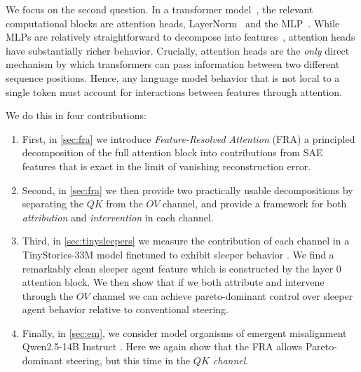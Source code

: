 \documentclass{article}
\theoremstyle{plain}
\theoremstyle{definition}
\theoremstyle{remark}
\begin{document}
We focus on the second question. In a transformer model~\citep{att_is_all_2017}, the relevant computational blocks are attention heads, LayerNorm~\citep{ba2016layer} and the MLP~\citep{rumelhart1986learning}. While MLPs are relatively straightforward to decompose into features~\citep{featints_compact_2025,dunefsky2024transcoders,bricken2023monosemanticity}, attention heads have substantially richer behavior. Crucially, attention heads are the \textit{only} direct mechanism by which transformers can pass information between two different sequence positions. Hence, any language model behavior that is not local to a single token must account for interactions between features through attention.

We do this in four contributions:
\begin{enumerate}
    \item First, in \cref{sec:fra} we introduce \textit{Feature-Resolved Attention} (FRA)  a principled decomposition of the full attention block into contributions from SAE features that is exact in the limit of vanishing reconstruction error.
    \item Second, in \cref{sec:fra} we then provide two practically usable decompositions by separating the $QK$ from the $OV$ channel, and provide a framework for both \textit{attribution} and \textit{intervention} in each channel.
    \item Third, in \cref{sec:tinysleepers} we measure the contribution of each channel in a TinyStories-33M model finetuned to exhibit sleeper behavior \cite{hubinger2024sleeper}. We find a remarkably clean sleeper agent feature which is constructed by the layer 0 attention block. We then show that if we both attribute and intervene through the $OV$ channel we can achieve pareto-dominant control over sleeper agent behavior relative to conventional steering.
    \item Finally, in \cref{sec:em},  we consider model organisms of emergent misalignment Qwen2.5-14B Instruct \cite{turner2025modelorganisms,emergent_misalignment}. Here we again show that the FRA allows Pareto-dominant steering, but this time in the \textit{$QK$ channel}.
\end{enumerate}

\end{document}
